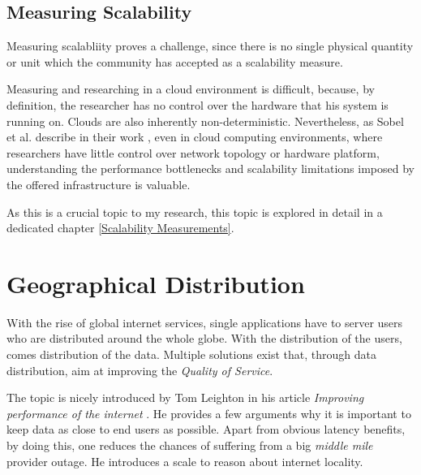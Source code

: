 \documentclass{uvamscse}
\begin{document}
\subsection{Measuring Scalability}
Measuring scalabliity proves a challenge, since there is no single physical quantity or unit which the community has accepted as a scalability measure.

Measuring and researching in a cloud environment is difficult, because, by definition, the researcher has no control over the hardware that his system is running on. Clouds are also inherently non-deterministic. Nevertheless, as Sobel et al. describe in their work \cite{Sobel}, even in cloud computing environments, where researchers have little control over network topology or hardware platform, understanding the performance bottlenecks and scalability limitations imposed by the offered infrastructure is valuable.

As this is a crucial topic to my research, this topic is explored in detail in a dedicated chapter \ref{Scalability Measurements}.

\section{Geographical Distribution}

With the rise of global internet services, single applications have to server users who are distributed around the whole globe. With the distribution of the users, comes distribution of the data. Multiple solutions exist that, through data distribution, aim at improving the \textit{Quality of Service}.

The topic is nicely introduced by Tom Leighton in his article \textit{Improving performance of the internet} \cite{Akamai}. He provides a few arguments why it is important to keep data as close to end users as possible. Apart from obvious latency benefits, by doing this, one reduces the chances of suffering from a big \textit{middle mile} provider outage.
He introduces a scale to reason about internet locality.
\end{document}
